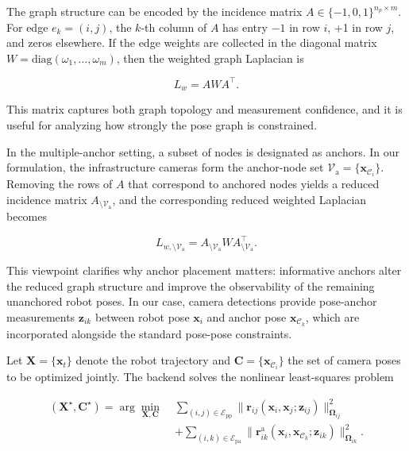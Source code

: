 The graph structure can be encoded by the incidence matrix
$A \in \{-1,0,1\}^{n_p \times m}$.
For edge $e_k = (i,j)$, the $k$-th column of $A$ has entry $-1$ in row $i$,
+1 in row $j$, and zeros elsewhere.
If the edge weights are collected in the diagonal matrix
$W = \mathrm{diag}(\omega_1, \ldots, \omega_m)$, then the weighted graph
Laplacian is

\begin{equation}
    L_w = A W A^{\top}.
    \label{eq:weighted_laplacian}
\end{equation}

This matrix captures both graph topology and measurement confidence, and it is
useful for analyzing how strongly the pose graph is constrained.

In the multiple-anchor setting, a subset of nodes is designated as anchors.
In our formulation, the infrastructure cameras form the anchor-node set
$\mathcal{V}_{\mathrm{a}} = \{\mathbf{x}_{\mathcal{C}_i}\}$.
Removing the rows of $A$ that correspond to anchored nodes yields a reduced
incidence matrix $A_{\setminus \mathcal{V}_{\mathrm{a}}}$, and the
corresponding reduced weighted Laplacian becomes

\begin{equation}
    L_{w,\setminus \mathcal{V}_{\mathrm{a}}} =
    A_{\setminus \mathcal{V}_{\mathrm{a}}}
    W
    A_{\setminus \mathcal{V}_{\mathrm{a}}}^{\top}.
    \label{eq:reduced_laplacian}
\end{equation}

This viewpoint clarifies why anchor placement matters: informative anchors alter
the reduced graph structure and improve the observability of the remaining
unanchored robot poses.
In our case, camera detections provide pose-anchor measurements
$\mathbf{z}_{ik}$ between robot pose $\mathbf{x}_i$ and anchor pose
$\mathbf{x}_{\mathcal{C}_k}$, which are incorporated alongside the standard
pose-pose constraints.

Let $\mathbf{X} = \{\mathbf{x}_t\}$ denote the robot trajectory and
$\mathbf{C} = \{\mathbf{x}_{\mathcal{C}_i}\}$ the set of camera poses to be
optimized jointly.
The backend solves the nonlinear least-squares problem

\begin{equation}
    \begin{aligned}
        (\mathbf{X}^{\star}, \mathbf{C}^{\star}) =
        \arg\min_{\mathbf{X},\mathbf{C}} \;&
        \sum_{(i,j) \in \mathcal{E}_{\mathrm{pp}}}
        \|\mathbf{r}_{ij}(\mathbf{x}_i, \mathbf{x}_j; \mathbf{z}_{ij})\|^2_{\boldsymbol{\Omega}_{ij}} \\
        &+ \sum_{(i,k) \in \mathcal{E}_{\mathrm{pa}}}
        \|\mathbf{r}^{\mathrm{a}}_{ik}(\mathbf{x}_i, \mathbf{x}_{\mathcal{C}_k}; \mathbf{z}_{ik})\|^2_{\boldsymbol{\Omega}_{ik}}.
    \end{aligned}
    \label{eq:pose_graph_objective}
\end{equation}

